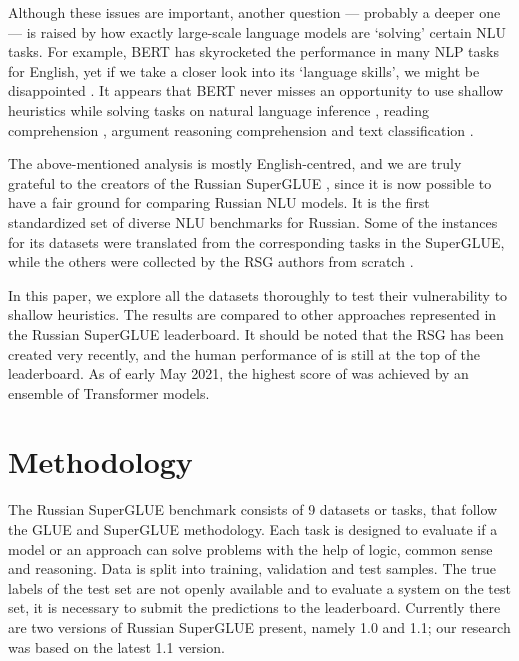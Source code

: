 \documentclass[11pt]{article}
\begin{document}
Although these issues are important, another question --- probably a deeper one --- is raised by how exactly large-scale language models are `solving' certain NLU tasks. For example, BERT has skyrocketed the performance in many NLP tasks for English, yet if we take a closer look into its `language skills', we might be disappointed \cite{rogers-etal-2020-primer}. It appears that BERT never misses an opportunity to use shallow heuristics while solving tasks on natural language inference \cite{mccoy-etal-2019-right, zellers-etal-2019-hellaswag, Jin_Jin_Zhou_Szolovits_2020}, reading comprehension \cite{Rogers2020GettingCT, Si2019WhatDB,  Sugawara_Stenetorp_Inui_Aizawa_2020, Yogatama2019LearningAE},
argument reasoning comprehension \cite{niven-kao-2019-probing} and text classification \cite{Jin_Jin_Zhou_Szolovits_2020}. 

The above-mentioned analysis is mostly English-centred, and we are truly grateful to the creators of the Russian SuperGLUE \cite{shavrina-etal-2020-russiansuperglue}, since it is now possible to have a fair ground for comparing Russian NLU models. It is the first standardized set of diverse NLU benchmarks for Russian.
Some of the instances for its datasets were translated from the corresponding tasks in the SuperGLUE, while the others were collected by the RSG authors from scratch \cite{fenogenova-etal-2020-read}. 

In this paper, we explore all the datasets thoroughly to test their vulnerability to shallow heuristics. The results are compared to other approaches represented in the Russian SuperGLUE leaderboard. It should be noted that the RSG has been created very recently, and the human performance of  is still at the top of the leaderboard. As of early May 2021, the highest score of  was achieved by an ensemble of Transformer models.

\section{Methodology} 
\label{section:methodology}

The Russian SuperGLUE benchmark consists of 9 datasets or tasks, that follow the GLUE and SuperGLUE methodology. Each task is designed to evaluate if a model or an approach can solve problems with the help of logic, common sense and reasoning. Data is split into training, validation and test samples. The true labels of the test set are not openly available and to evaluate a system on the test set, it is necessary to submit the predictions to the leaderboard. Currently there are two versions of Russian SuperGLUE present, namely 1.0 and 1.1; our research was based on the latest 1.1 version.
\end{document}
